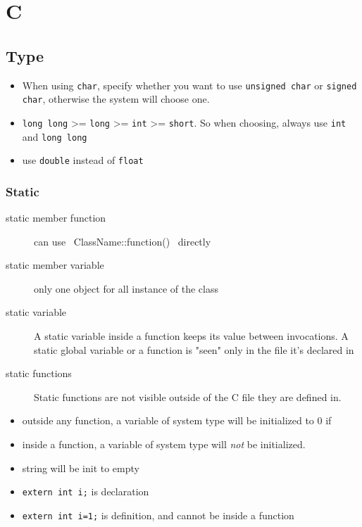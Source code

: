 \section{C}

\subsection{Type}
\begin{itemize}
\item When using \texttt{char}, specify whether you want to use
  \texttt{unsigned char} or \texttt{signed char}, otherwise the system
  will choose one.
\item \texttt{long long} >= \texttt{long} >= \texttt{int} >=
  \texttt{short}. So when choosing, always use \texttt{int} and
  \texttt{long long}
\item use \texttt{double} instead of \texttt{float}
\end{itemize}

\subsubsection{Static}
\begin{description}
\item [static member function] can use ~ClassName::function()~ directly
\item [static member variable] only one object for all instance of the
  class
\item [static variable] A static variable inside a function keeps its
  value between invocations.  A static global variable or a function
  is "seen" only in the file it's declared in
\item [static functions] Static functions are not visible outside of
  the C file they are defined in.
\end{description}

\begin{itemize}
\item outside any function, a variable of system type will be initialized to 0 if
\item inside a function, a variable of system type will \textit{not} be initialized.
\item string will be init to empty
\item \texttt{extern int i;} is declaration
\item \texttt{extern int i=1;} is definition, and cannot be inside a function
\end{itemize}

